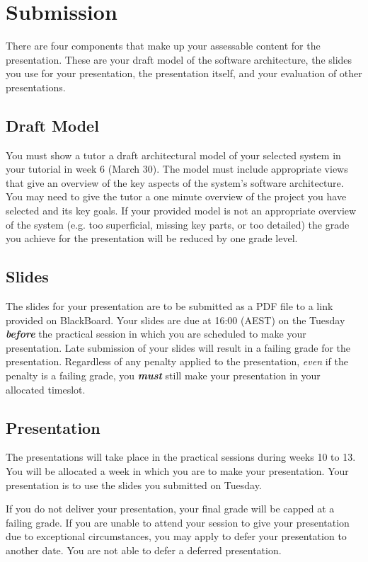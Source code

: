 \documentclass{csse4400}
\begin{document}
\section{Submission}
There are four components that make up your assessable content for the presentation.
These are your draft model of the software architecture, the slides you use for your presentation,
the presentation itself, and your evaluation of other presentations.

\subsection{Draft Model}
You must show a tutor a draft architectural model of your selected system in your tutorial in week 6 (March 30).
The model must include appropriate views that give an overview of the key aspects of the system's software architecture.
You may need to give the tutor a one minute overview of the project you have selected and its key goals.
If your provided model is not an appropriate overview of the system
(e.g. too superficial, missing key parts, or too detailed)
the grade you achieve for the presentation will be reduced by one grade level.

\subsection{Slides}
The slides for your presentation are to be submitted as a PDF file to a link provided on BlackBoard.
Your slides are due at 16:00 (AEST) on the Tuesday \textbf{\textit{before}}
the practical session in which you are scheduled to make your presentation.
Late submission of your slides will result in a failing grade for the presentation.
Regardless of any penalty applied to the presentation, \emph{even} if the penalty is a failing grade,
you \textbf{\textit{must}} still make your presentation in your allocated timeslot.

\subsection{Presentation}
The presentations will take place in the practical sessions during weeks 10 to 13.
You will be allocated a week in which you are to make your presentation.
Your presentation is to use the slides you submitted on Tuesday.

If you do not deliver your presentation, your final grade will be capped at a failing grade.
If you are unable to attend your session to give your presentation due to exceptional circumstances,
you may apply to defer your presentation to another date.
You are not able to defer a deferred presentation.
\end{document}
